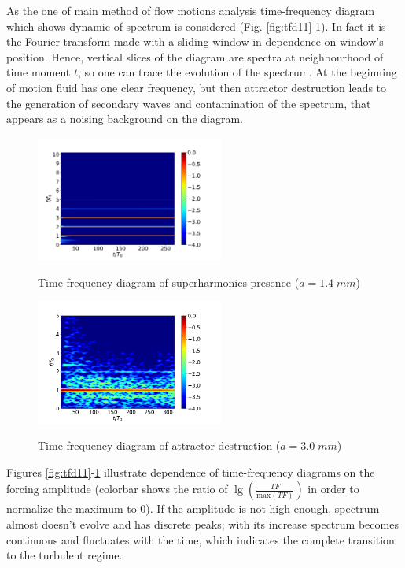 \documentclass[a4wide,fontsize=12pt]{article}
\begin{document}
As the one of main method of flow motions analysis time-frequency diagram which shows dynamic of spectrum is considered (Fig. \ref{fig:tfd11}-\ref{fig:tfdX}). In fact it is the Fourier-transform made with a sliding window in dependence on window's position. Hence, vertical slices of the diagram are spectra at neighbourhood of time moment $t$, so one can trace the evolution of the spectrum. At the beginning of motion fluid has one clear frequency, but then attractor destruction leads to the generation of secondary waves and contamination of the spectrum, that appears as a noising background on the diagram. 

\begin{figure}
\begin{multicols}{2}
    \centering
    \includegraphics[width=0.55\textwidth]{Figs/TFBG14.png}
    \caption{Time-frequency diagram of superharmonics presence ($a=1.4\;mm$)}
    \label{fig:tfd11}
    \hfill
     \includegraphics[width=0.55\textwidth]{Figs/TFD_pos34693_nperseg400_to0T.png}
    \caption{Time-frequency diagram of attractor destruction ($a=3.0\;mm$)}
    \label{fig:tfdX}
\end{multicols}
\end{figure}

Figures \ref{fig:tfd11}-\ref{fig:tfdX} illustrate dependence of time-frequency diagrams on the forcing amplitude (colorbar shows the ratio of $\lg\left(\frac{TF}{\text{max} (TF)}\right)$ in order to normalize the maximum to 0).  If the amplitude is not high enough, spectrum almost doesn't evolve and has discrete peaks; with its increase spectrum becomes continuous and fluctuates with the time, which indicates the complete transition to the turbulent regime.
\end{document}
